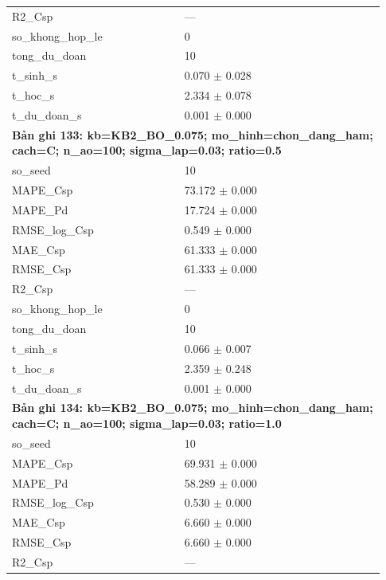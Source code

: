 \begin{longtable}{p{0.43\linewidth}p{0.50\linewidth}}
R2\_\allowbreak Csp & — \\
so\_\allowbreak khong\_\allowbreak hop\_\allowbreak le & 0 \\
tong\_\allowbreak du\_\allowbreak doan & 10 \\
t\_\allowbreak sinh\_\allowbreak s & 0.070 $\pm$ 0.028 \\
t\_\allowbreak hoc\_\allowbreak s & 2.334 $\pm$ 0.078 \\
t\_\allowbreak du\_\allowbreak doan\_\allowbreak s & 0.001 $\pm$ 0.000 \\
\midrule
\multicolumn{2}{p{0.95\linewidth}}{\textbf{Bản ghi 133: kb=KB2\_BO\_0.075; mo\_hinh=chon\_dang\_ham; cach=C; n\_ao=100; sigma\_lap=0.03; ratio=0.5}} \\
so\_\allowbreak seed & 10 \\
MAPE\_\allowbreak Csp & 73.172 $\pm$ 0.000 \\
MAPE\_\allowbreak Pd & 17.724 $\pm$ 0.000 \\
RMSE\_\allowbreak log\_\allowbreak Csp & 0.549 $\pm$ 0.000 \\
MAE\_\allowbreak Csp & 61.333 $\pm$ 0.000 \\
RMSE\_\allowbreak Csp & 61.333 $\pm$ 0.000 \\
R2\_\allowbreak Csp & — \\
so\_\allowbreak khong\_\allowbreak hop\_\allowbreak le & 0 \\
tong\_\allowbreak du\_\allowbreak doan & 10 \\
t\_\allowbreak sinh\_\allowbreak s & 0.066 $\pm$ 0.007 \\
t\_\allowbreak hoc\_\allowbreak s & 2.359 $\pm$ 0.248 \\
t\_\allowbreak du\_\allowbreak doan\_\allowbreak s & 0.001 $\pm$ 0.000 \\
\midrule
\multicolumn{2}{p{0.95\linewidth}}{\textbf{Bản ghi 134: kb=KB2\_BO\_0.075; mo\_hinh=chon\_dang\_ham; cach=C; n\_ao=100; sigma\_lap=0.03; ratio=1.0}} \\
so\_\allowbreak seed & 10 \\
MAPE\_\allowbreak Csp & 69.931 $\pm$ 0.000 \\
MAPE\_\allowbreak Pd & 58.289 $\pm$ 0.000 \\
RMSE\_\allowbreak log\_\allowbreak Csp & 0.530 $\pm$ 0.000 \\
MAE\_\allowbreak Csp & 6.660 $\pm$ 0.000 \\
RMSE\_\allowbreak Csp & 6.660 $\pm$ 0.000 \\
R2\_\allowbreak Csp & — \\

\end{longtable}
